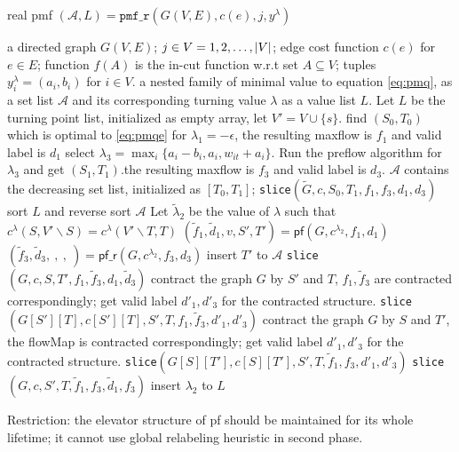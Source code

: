 \documentclass{article}
\begin{document}
\begin{algorithm}
\caption{real pmf $(\mathcal{A}, L) = \texttt{pmf\_r}(G(V,E), c(e), j, y^{\lambda})$}\label{alg:pmfRC}
\begin{algorithmic}[1]
\REQUIRE a directed graph $G(V, E)$; $j \in V={1,2,\dots, \lvert V\rvert}$; edge cost function $c(e)$ for $e \in E$; function $f(A)$ is the in-cut function w.r.t set $A\subseteq V$; tuples $y^{\lambda}_i = (a_i, b_i)$ for $i \in V$.
\ENSURE a nested family of minimal value to equation \eqref{eq:pmq}, as a set list $\mathcal{A}$ and its corresponding turning value $\lambda$ as a value list $L$.
\STATE Let $L$ be the turning point list, initialized as empty array, let $V'=V\cup\{s\}$.
\STATE find $(S_0, T_0)$ which is optimal to \eqref{eq:pmqe} for $ \lambda_1  = -\epsilon$, the resulting maxflow is $f_1$ and valid label is $d_1$
\STATE select $\lambda_3 = \max_{i}\{a_i-b_i, a_i, w_{it} + a_i\}$. Run the preflow algorithm for $\lambda_3$ and get $(S_1,T_1)$.\footnotemark the resulting maxflow is $f_3$ and valid label is $d_3$.
\STATE $\mathcal{A}$ contains the decreasing set list, initialized as $[T_0, T_1]$;
\STATE \texttt{slice}$(\widetilde{G}, c, S_0, T_1, f_1, f_3, d_1, d_3)$
\STATE sort $L$ and reverse sort $\mathcal{A}$
\STATE Let $\tilde{\lambda}_2$ be the value of $\lambda$ such that $c^{\lambda}(S, V'\backslash S) = 
c^{\lambda}(V'\backslash T, T)$ 
\STATE $(\tilde{f}_1, \tilde{d}_1, v, S', T') = \textsf{pf}(G, c^{\lambda_2}, f_1, d_1)$
\STATE $(\tilde{f}_3, \tilde{d}_3, ~, ~, ~) = \textsf{pf\_r}(G, c^{\lambda_2}, f_3, d_3)$
\STATE insert $T'$ to $\mathcal{A}$
\STATE \texttt{slice}$(G, c, S, T', f_1, \tilde{f}_3, d_1, \tilde{d}_3)$
\STATE contract the graph $G$ by $S'$ and $T$, $f_1, \tilde{f}_3$ are contracted correspondingly; get valid label $d'_1, d'_3$ for the contracted structure.
\STATE \texttt{slice}$(G[S'][T], c[S'][T], S', T, f_1, \tilde{f}_3, d'_1, d'_3)$
\ELSE
\STATE contract the graph $G$ by $S$ and $T'$, the flowMap is contracted correspondingly; get valid label $d'_1, d'_3$ for the contracted structure.
\STATE \texttt{slice}$(G[S][T'], c[S][T'], S', T, \tilde{f}_1, f_3, d'_1, d'_3)$
\STATE \texttt{slice}$(G, c, S', T, \tilde{f}_1, f_3, \tilde{d}_1, f_3)$
\ENDIF
\ELSE
\STATE insert $\lambda_2$ to $L$
\ENDIF
\ENDFUNCTION
\end{algorithmic}
\end{algorithm}
Restriction: the elevator structure of pf should be maintained for its whole lifetime; it cannot use global relabeling heuristic in second phase.
\end{document}
